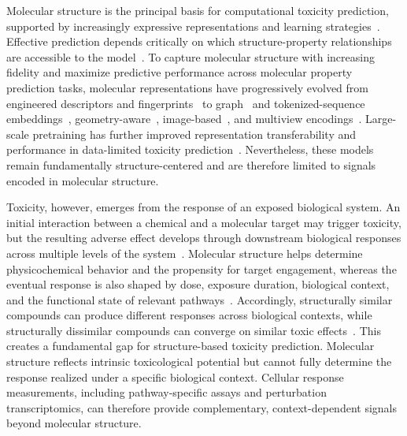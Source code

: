 \documentclass[11pt,a4paper]{article}
\begin{document}
Molecular structure is the principal basis for computational toxicity prediction, supported by increasingly expressive representations and learning strategies~\cite{wu2018moleculenet}. Effective prediction depends critically on which structure-property relationships are accessible to the model~\cite{deng2023keyelements}. To capture molecular structure with increasing fidelity and maximize predictive performance across molecular property prediction tasks, molecular representations have progressively evolved from engineered descriptors and fingerprints~\cite{rogers2010extended} to graph~\cite{gilmer2017neural} and tokenized-sequence embeddings~\cite{chithrananda2020chemberta}, geometry-aware~\cite{zhou2023unimol}, image-based~\cite{zeng2022imagemol}, and multiview encodings~\cite{zhang2024mvmrl}. Large-scale pretraining has further improved representation transferability and performance in data-limited toxicity prediction~\cite{mendezlucio2024mole}. Nevertheless, these models remain fundamentally structure-centered and are therefore limited to signals encoded in molecular structure.

Toxicity, however, emerges from the response of an exposed biological system. An initial interaction between a chemical and a molecular target may trigger toxicity, but the resulting adverse effect develops through downstream biological responses across multiple levels of the system~\cite{ankley2010aop}. Molecular structure helps determine physicochemical behavior and the propensity for target engagement, whereas the eventual response is also shaped by dose, exposure duration, biological context, and the functional state of relevant pathways~\cite{niepel2017celltype}. Accordingly, structurally similar compounds can produce different responses across biological contexts, while structurally dissimilar compounds can converge on similar toxic effects~\cite{stumpfe2019activitycliffs}. This creates a fundamental gap for structure-based toxicity prediction. Molecular structure reflects intrinsic toxicological potential but cannot fully determine the response realized under a specific biological context. Cellular response measurements, including pathway-specific assays and perturbation transcriptomics, can therefore provide complementary, context-dependent signals beyond molecular structure.
\end{document}
